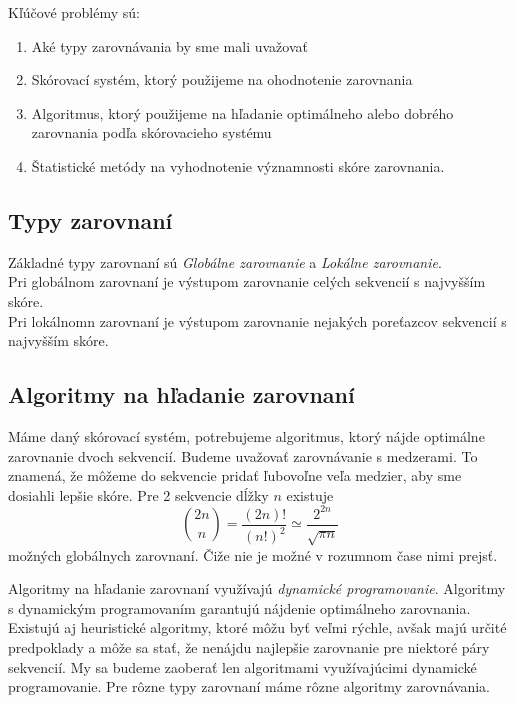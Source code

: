 Kľúčové problémy sú:
\begin{enumerate}
\item Aké typy zarovnávania by sme mali uvažovať
\item Skórovací systém, ktorý použijeme na ohodnotenie zarovnania
\item Algoritmus, ktorý použijeme na hľadanie optimálneho alebo dobrého zarovnania podľa skórovacieho systému
\item Štatistické metódy na vyhodnotenie významnosti skóre zarovnania.
\end{enumerate}

\subsection{Typy zarovnaní}
Základné typy zarovnaní sú \textit{Globálne zarovnanie} a \textit{Lokálne zarovnanie}.\\ 
Pri globálnom zarovnaní je výstupom zarovnanie celých sekvencií s najvyšším skóre.\\
Pri lokálnomn zarovnaní je výstupom zarovnanie nejakých poreťazcov sekvencií s najvyšším skóre.


\subsection{Algoritmy na hľadanie zarovnaní}
Máme daný skórovací systém, potrebujeme algoritmus, ktorý nájde optimálne zarovnanie dvoch sekvencií.
Budeme uvažovať zarovnávanie s medzerami. To znamená, že môžeme do sekvencie pridať ľubovoľne veľa medzier, aby sme dosiahli lepšie skóre. Pre 2 sekvencie dĺžky $n$ existuje 
$$ {2n \choose n}  = \frac{(2n)!}{(n!)^2} \simeq \frac{2^{2n}}{\sqrt{\pi n}} $$
možných globálnych zarovnaní. Čiže nie je možné v rozumnom čase nimi prejsť.

Algoritmy na hľadanie zarovnaní využívajú \textit{dynamické programovanie}. Algoritmy s dynamickým programovaním garantujú nájdenie optimálneho zarovnania.
Existujú aj heuristické algoritmy, ktoré môžu byť veľmi rýchle, avšak majú určité predpoklady a môže sa stať, že nenájdu najlepšie zarovnanie pre niektoré páry sekvencií.
My sa budeme zaoberať len algoritmami využívajúcimi dynamické programovanie. Pre rôzne typy zarovnaní máme rôzne algoritmy zarovnávania.

